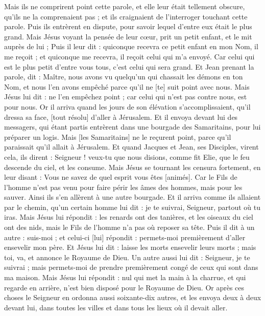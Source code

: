 \begin{multicols}{2}
Mais ils ne comprirent point cette parole, et elle leur était tellement obscure, qu'ils ne la comprenaient pas ; et ils craignaient de l'interroger touchant cette parole.
Puis ils entrèrent en dispute, pour savoir lequel d'entre eux était le plus grand.
Mais Jésus voyant la pensée de leur cœur, prit un petit enfant, et le mit auprès de lui ;
Puis il leur dit : quiconque recevra ce petit enfant en mon Nom, il me reçoit ; et quiconque me recevra, il reçoit celui qui m'a envoyé. Car celui qui est le plus petit d'entre vous tous, c'est celui qui sera grand.
Et Jean prenant la parole, dit : Maître, nous avons vu quelqu'un qui chassait les démons en ton Nom, et nous l'en avons empêché parce qu'il ne [te] suit point avec nous.
Mais Jésus lui dit : ne l'en empêchez point ; car celui qui n'est pas contre nous, est pour nous.
Or il arriva quand les jours de son élévation s'accomplissaient, qu'il dressa sa face, [tout résolu] d'aller à Jérusalem.
Et il envoya devant lui des messagers, qui étant partis entrèrent dans une bourgade des Samaritains, pour lui préparer un logis.
Mais [les Samaritains] ne le reçurent point, parce qu'il paraissait qu'il allait à Jérusalem.
Et quand Jacques et Jean, ses Disciples, virent cela, ils dirent : Seigneur ! veux-tu que nous disions, comme fit Elie, que le feu descende du ciel, et les consume.
Mais Jésus se tournant les censura fortement, en leur disant : Vous ne savez de quel esprit vous êtes [animés].
Car le Fils de l'homme n'est pas venu pour faire périr les âmes des hommes, mais pour les sauver. Ainsi ils s'en allèrent à une autre bourgade.
Et il arriva comme ils allaient par le chemin, qu'un certain homme lui dit : je te suivrai, Seigneur, partout où tu iras.
Mais Jésus lui répondit : les renards ont des tanières, et les oiseaux du ciel ont des nids, mais le Fils de l'homme n'a pas où reposer sa tête.
Puis il dit à un autre : suis-moi ; et celui-ci [lui] répondit : permets-moi premièrement d'aller ensevelir mon père.
Et Jésus lui dit : laisse les morts ensevelir leurs morts ; mais toi, va, et annonce le Royaume de Dieu.
Un autre aussi lui dit : Seigneur, je te suivrai ; mais permets-moi de prendre premièrement congé de ceux qui sont dans ma maison.
Mais Jésus lui répondit : nul qui met la main à la charrue, et qui regarde en arrière, n'est bien disposé pour le Royaume de Dieu.
\VerseOne{}Or après ces choses le Seigneur en ordonna aussi soixante-dix autres, et les envoya deux à deux devant lui, dans toutes les villes et dans tous les lieux où il devait aller.

\end{multicols}

